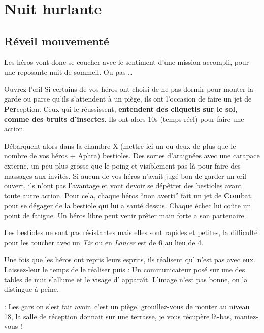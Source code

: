 \section{Nuit hurlante}

\subsection{Réveil mouvementé}

Les héros vont donc se coucher avec le sentiment d’une mission accompli, pour une reposante nuit de sommeil. Ou pas \dots

\begin{paperbox}{Ouvrez l’œil}
Si certains de vos héros ont choisi de ne pas dormir pour monter la garde ou parce qu’ils s’attendent à un piège, ils ont l’occasion de faire un jet de \textbf{Per}ception. Ceux qui le réussissent, \textbf{entendent des cliquetis sur le sol, comme des bruits d’insectes}. Ils ont alors 10s (temps réel) pour faire une action.
\end{paperbox}

Débarquent alors dans la chambre X (mettre ici un ou deux de plus que le nombre de vos héros + Aphra) bestioles. Des sortes d’araignées avec une carapace externe, un peu plus grosse que le poing et visiblement pas là pour faire des massages aux invités. Si aucun de vos héros n’avait jugé bon de garder un œil ouvert, ils n’ont pas l’avantage et vont devoir se dépêtrer des bestioles avant toute autre action. Pour cela, chaque héros “non averti” fait un jet de \textbf{Com}bat, pour se dégager de la bestiole qui lui a sauté dessus. Chaque échec lui coûte un point de fatigue. Un héros libre peut venir prêter main forte a son partenaire.

Les bestioles ne sont pas résistantes mais elles sont rapides et petites, la difficulté pour les toucher avec un \textit{Tir} ou en \textit{Lancer} est de \textbf{6} au lieu de 4.

Une fois que les héros ont repris leurs esprits, ils réalisent qu’ n’est pas avec eux. Laissez-leur le temps de le réaliser puis : Un communicateur posé sur une des tables de nuit s’allume et le visage d’ apparaît. L’image n’est pas bonne, on la distingue à peine.

\begin{quotebox}
\noindent\textbf{}: Les gars on s’est fait avoir, c’est un piège, grouillez-vous de monter au niveau 18, la salle de réception donnait sur une terrasse, je vous récupère là-bas, maniez-vous !
\end{quotebox}


